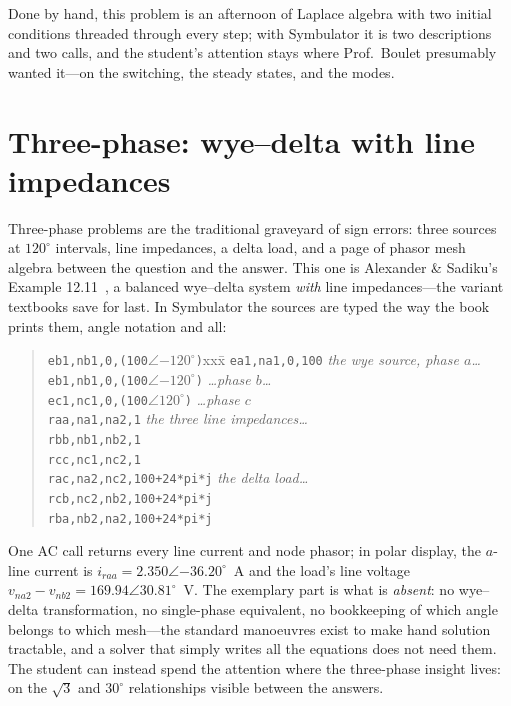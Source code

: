\documentclass[11pt,oneside]{report}
\newcommand{\code}[1]{\texttt{#1}}
\begin{document}
Done by hand, this problem is an afternoon of Laplace algebra with
two initial conditions threaded through every step; with Symbulator
it is two descriptions and two calls, and the student's attention
stays where Prof.\ Boulet presumably wanted it---on the switching,
the steady states, and the modes.

\section{Three-phase: wye--delta with line impedances}
\label{sec:threephase}

Three-phase problems are the traditional graveyard of sign errors:
three sources at $120^{\circ}$ intervals, line impedances, a delta
load, and a page of phasor mesh algebra between the question and the
answer. This one is Alexander \& Sadiku's Example
12.11~\cite{alexander}, a balanced wye--delta system \emph{with} line
impedances---the variant textbooks save for last. In Symbulator the
sources are typed the way the book prints them, angle notation and
all:

\begin{quote}
\begin{tabbing}
\code{eb1,nb1,0,(100$\angle{-120}^{\circ}$)}xxx\=\kill
\code{ea1,na1,0,100}    \> \emph{the wye source, phase $a$\ldots} \\
\code{eb1,nb1,0,(100$\angle{-120}^{\circ}$)}
                        \> \emph{\ldots phase $b$\ldots} \\
\code{ec1,nc1,0,(100$\angle 120^{\circ}$)}
                        \> \emph{\ldots phase $c$} \\
\code{raa,na1,na2,1}    \> \emph{the three line impedances\ldots} \\
\code{rbb,nb1,nb2,1} \\
\code{rcc,nc1,nc2,1} \\
\code{rac,na2,nc2,100+24*pi*j}
                        \> \emph{the delta load\ldots} \\
\code{rcb,nc2,nb2,100+24*pi*j} \\
\code{rba,nb2,na2,100+24*pi*j}
\end{tabbing}
\end{quote}

\noindent One AC call returns every line current and node phasor; in
polar display, the $a$-line current is
$i_{raa} = 2.350\angle{-36.20}^{\circ}$~A and the load's line voltage
$v_{na2} - v_{nb2} = 169.94\angle 30.81^{\circ}$~V. The exemplary
part is what is \emph{absent}: no wye--delta transformation, no
single-phase equivalent, no bookkeeping of which angle belongs to
which mesh---the standard manoeuvres exist to make hand solution
tractable, and a solver that simply writes all the equations does not
need them. The student can instead spend the attention where the
three-phase insight lives: on the $\sqrt{3}$ and $30^{\circ}$
relationships visible between the answers.
\end{document}
